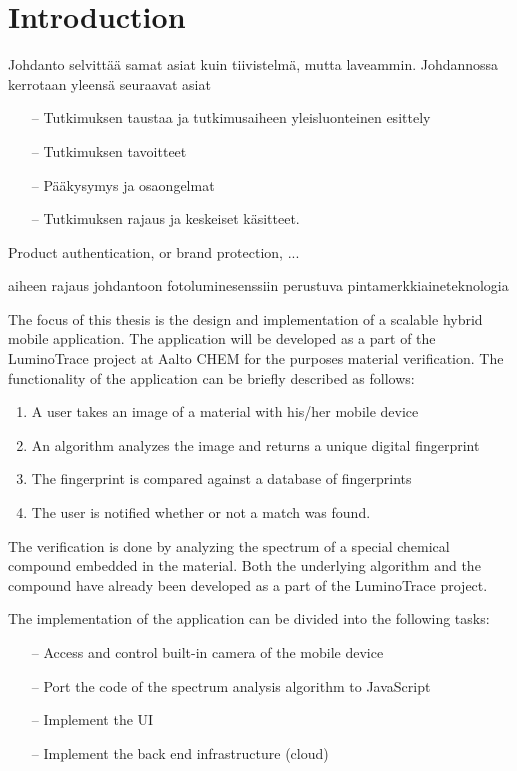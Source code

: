 \documentclass[thesis.tex]{subfiles}
\begin{document}
\chapter{Introduction}
\label{chapter:intro}


Johdanto selvittää samat asiat kuin tiivistelmä, mutta laveammin. Johdannossa kerrotaan yleensä seuraavat asiat

\begin{itemize}
\item[--]Tutkimuksen taustaa ja tutkimusaiheen yleisluonteinen esittely
\item[--]Tutkimuksen tavoitteet
\item[--]Pääkysymys ja osaongelmat
\item[--]Tutkimuksen rajaus ja keskeiset käsitteet.
\end{itemize}

Product authentication, or brand protection, ...

aiheen rajaus johdantoon
fotoluminesenssiin perustuva pintamerkkiaineteknologia


The focus of this thesis is the design and implementation of a scalable hybrid mobile application. The application will be developed as a part of the LuminoTrace project at Aalto CHEM for the purposes material verification. The functionality of the application can be briefly described as follows:

\begin{enumerate}
\item A user takes an image of a material with his/her mobile device
\item An algorithm analyzes the image and returns a unique digital fingerprint
\item The fingerprint is compared against a database of fingerprints
\item The user is notified whether or not a match was found.
\end{enumerate}

The verification is done by analyzing the spectrum of a special chemical compound embedded in the material. Both the underlying algorithm and the compound have already been developed as a part of the LuminoTrace project.

The implementation of the application can be divided into the following tasks:

\begin{itemize}
\item[--]Access and control built-in camera of the mobile device
\item[--]Port the code of the spectrum analysis algorithm to JavaScript
\item[--]Implement the UI
\item[--]Implement the back end infrastructure (cloud)
\end{itemize}
\end{document}

